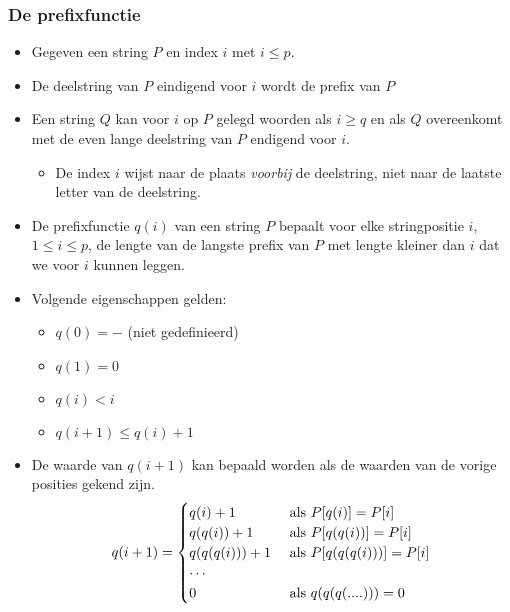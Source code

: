 \subsubsection{De prefixfunctie}
\begin{itemize}
    \item Gegeven een string $P$ en index $i$ met $i \leq p$.
    \item De deelstring van $P$ eindigend voor $i$ wordt de prefix van $P$ 
    \item Een string $Q$ kan voor $i$ op $P$ gelegd woorden als $i \geq q$ en als $Q$ overeenkomt met de even lange deelstring van $P$ endigend voor $i$.
    \begin{itemize}
        \item De index $i$ wijst naar de plaats \textit{voorbij} de deelstring, niet naar de laatste letter van de deelstring.
    \end{itemize}
    \item De prefixfunctie $q(i)$ van een string $P$ bepaalt voor elke stringpositie $i$, $1 \leq i \leq p$, de lengte van de langste prefix van $P$ met lengte kleiner dan $i$ dat we voor $i$ kunnen leggen.

    \item Volgende eigenschappen gelden:
    \begin{itemize}
        \item $q(0) = -$ (niet gedefinieerd)
        \item $q(1) = 0$
        \item $q(i) < i$
        \item $q(i + 1) \leq q(i) + 1$
    \end{itemize}
    \item De waarde van $q(i + 1)$ kan bepaald worden als de waarden van de vorige posities gekend zijn.
    $$q(i + 1) = \begin{cases}
        q(i) + 1 & \hbox{ als } P[q(i)] = P[i]  \\
        q(q(i)) + 1 & \hbox{ als } P[q(q(i))] = P[i] \\
        q(q(q(i))) + 1 & \hbox{ als } P[q(q(q(i)))] = P[i] \\
        \cdots \\
        0 & \hbox { als } q(q(q(....))) = 0
    \end{cases}$$


\end{itemize}
